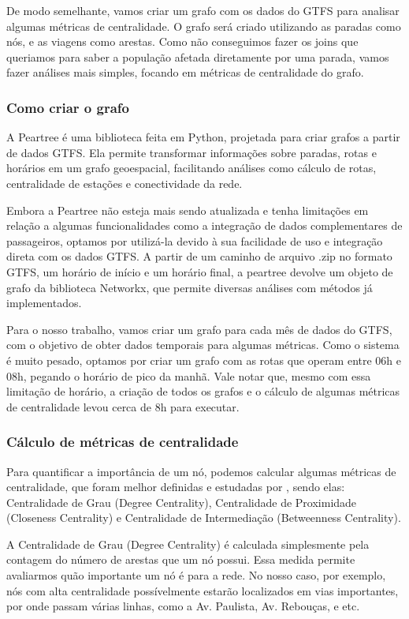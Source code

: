 De modo semelhante, vamos criar um grafo com os dados do GTFS para analisar algumas métricas de centralidade. O grafo será criado utilizando as paradas como nós, e as viagens como arestas. Como não conseguimos fazer os joins que queriamos para saber a população afetada diretamente por uma parada, vamos fazer análises mais simples, focando em métricas de centralidade do grafo.

\subsubsection{Como criar o grafo}

A Peartree é uma biblioteca feita em Python, projetada para criar grafos a partir de dados GTFS. Ela permite transformar informações sobre paradas, rotas e horários em um grafo geoespacial, facilitando análises como cálculo de rotas, centralidade de estações e conectividade da rede. 

Embora a Peartree não esteja mais sendo atualizada e tenha limitações em relação a algumas funcionalidades como a integração de dados complementares de passageiros, optamos por utilizá-la devido à sua facilidade de uso e integração direta com os dados GTFS. A partir de um caminho de arquivo .zip no formato GTFS, um horário de início e um horário final, a peartree devolve um objeto de grafo da biblioteca Networkx, que permite diversas análises com métodos já implementados.

Para o nosso trabalho, vamos criar um grafo para cada mês de dados do GTFS, com o objetivo de obter dados temporais para algumas métricas. Como o sistema é muito pesado, optamos por criar um grafo com as rotas que operam entre 06h e 08h, pegando o horário de pico da manhã. Vale notar que, mesmo com essa limitação de horário, a criação de todos os grafos e o cálculo de algumas métricas de centralidade levou cerca de 8h para executar.

\subsubsection{Cálculo de métricas de centralidade}

Para quantificar a importância de um nó, podemos calcular algumas métricas de centralidade, que foram melhor definidas e estudadas por \citet{FREEMAN1978215}, sendo elas: Centralidade de Grau (Degree Centrality), Centralidade de Proximidade (Closeness Centrality) e Centralidade de Intermediação (Betweenness Centrality).

A Centralidade de Grau (Degree Centrality) é calculada simplesmente pela contagem do número de arestas que um nó possui. Essa medida permite avaliarmos quão importante um nó é para a rede. No nosso caso, por exemplo, nós com alta centralidade possívelmente estarão localizados em vias importantes, por onde passam várias linhas, como a Av. Paulista, Av. Rebouças, e etc.

